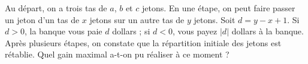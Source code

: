 Au départ, on a trois tas de $a$, $b$ et $c$ jetons. En une étape, on peut faire passer un jeton d'un tas de $x$ jetons sur un autre tas de $y$ jetons. Soit $d = y - x + 1$. Si $d > 0$, la banque vous paie $d$ dollars ; si $d < 0$, vous payez $|d|$ dollars à la banque. Après plusieurs étapes, on constate que la répartition initiale des jetons est rétablie. Quel gain maximal a-t-on pu réaliser à ce moment ?
